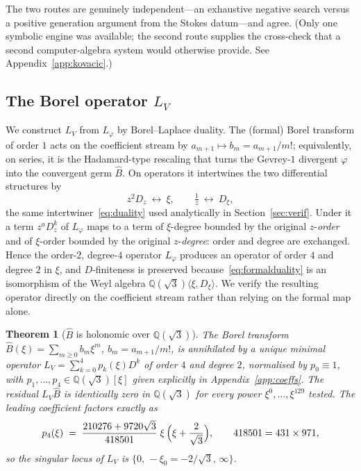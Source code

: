 \documentclass[11pt,reqno]{amsart}
\renewcommand{\_}{\vquadorigunderscore\allowbreak}
\theoremstyle{plain}
\newtheorem{theorem}{Theorem}[section]
\theoremstyle{definition}
\newcommand{\Bhat}{\widehat{B}}
\newcommand{\Lphi}{L_{\varphi}}
\newcommand{\LV}{L_{V}}
\newcommand{\Qsqrt}{\mathbb{Q}(\sqrt3)}
\newcommand{\xizero}{\xi_0}
\begin{document}
The two routes are genuinely independent---an exhaustive negative search versus a positive
generation argument from the Stokes datum---and agree. (Only one symbolic engine was available;
the second route supplies the cross-check that a second computer-algebra system would otherwise
provide. See Appendix~\ref{app:kovacic}.)

\subsection{The Borel operator \texorpdfstring{$\LV$}{LV}}
We construct $\LV$ from $\Lphi$ by Borel--Laplace duality. The (formal) Borel transform of order
$1$ acts on the coefficient stream by $a_{m+1}\mapsto b_m=a_{m+1}/m!$; equivalently, on series, it
is the Hadamard-type rescaling that turns the Gevrey-$1$ divergent $\varphi$ into the convergent
germ $\Bhat$. On operators it intertwines the two differential structures by
\begin{equation}\label{eq:formalduality}
  z^2 D_z\ \longleftrightarrow\ \xi,\qquad \tfrac1z\ \longleftrightarrow\ D_\xi,
\end{equation}
the same intertwiner~\eqref{eq:duality} used analytically in Section~\ref{sec:verif}. Under it a
term $z^{a}D_z^{k}$ of $\Lphi$ maps to a term of $\xi$-degree bounded by the original
$z$-\emph{order} and of $\xi$-order bounded by the original $z$-\emph{degree}: order and degree are
exchanged. Hence the order-$2$, degree-$4$ operator $\Lphi$ produces an operator of order $4$ and
degree $2$ in $\xi$, and $D$-finiteness is preserved because~\eqref{eq:formalduality} is an
isomorphism of the Weyl algebra $\Qsqrt\langle\xi,D_\xi\rangle$. We verify the resulting operator
directly on the coefficient stream rather than relying on the formal map alone.

\begin{theorem}[$\Bhat$ is holonomic over $\Qsqrt$]\label{thm:LV}
The Borel transform $\Bhat(\xi)=\sum_{m\ge0}b_m\xi^m$, $b_m=a_{m+1}/m!$, is annihilated by a
unique minimal operator $\LV=\sum_{k=0}^4 p_k(\xi)D^k$ of order $4$ and degree $2$, normalised by
$p_0\equiv1$, with $p_1,\dots,p_4\in\Qsqrt[\xi]$ given explicitly in
Appendix~\ref{app:coeffs}. The residual $\LV\Bhat$ is identically zero in $\Qsqrt$ for every power
$\xi^0,\dots,\xi^{129}$ tested. The leading coefficient factors exactly as
\begin{equation}\label{eq:p4-factor}
  p_4(\xi)\;=\;\frac{210276+9720\sqrt3}{418501}\;\xi\,\Bigl(\xi+\frac{2}{\sqrt3}\Bigr),
  \qquad 418501=431\times971,
\end{equation}
so the singular locus of $\LV$ is $\{0,\,-\xizero=-2/\sqrt3,\,\infty\}$.
\end{theorem}
\end{document}
